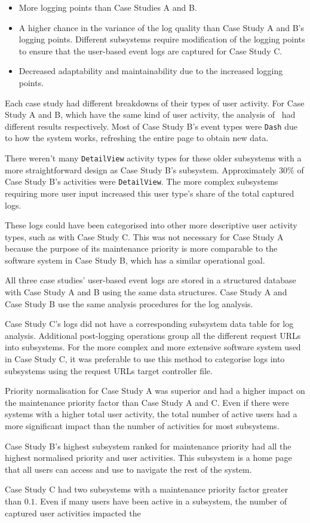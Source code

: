 \begin{itemize}
	\item More logging points than Case Studies A and B. 
	\item A higher chance in the variance of the log quality than Case Study A and B's logging points. Different subsystems require modification of the logging points to ensure that the user-based event logs are captured for Case Study C.
	\item Decreased adaptability and maintainability due to the increased logging points.
\end{itemize}

Each case study had different breakdowns of their types of user activity. For Case Study A and B, which have the same kind of user activity, the analysis of~ had different results respectively. Most of Case Study B's event types were \texttt{Dash} due to how the system works, refreshing the entire page to obtain new data. \par There weren't many \texttt{DetailView} activity types for these older subsystems with a more straightforward design as Case Study B's subsystem. Approximately $30\%$ of Case Study B's activities were \texttt{DetailView}. The more complex subsystems requiring more user input increased this user type's share of the total captured logs. \par These logs could have been categorised into other more descriptive user activity types, such as with Case Study C. This was not necessary for Case Study A because the purpose of its maintenance priority is more comparable to the software system in Case Study B, which has a similar operational goal. \par All three case studies' user-based event logs are stored in a structured database with Case Study A and B using the same data structures. Case Study A and Case Study B use the same analysis procedures for the log analysis. \par Case Study C's logs did not have a corresponding subsystem data table for log analysis. Additional post-logging operations group all the different request URLs into subsystems. For the more complex and more extensive software system used in Case Study C, it was preferable to use this method to categorise logs into subsystems using the request URLs target controller file. \par Priority normalisation for Case Study A was superior and had a higher impact on the maintenance priority factor than Case Study A and C. Even if there were systems with a higher total user activity, the total number of active users had a more significant impact than the number of activities for most subsystems. \par Case Study B's highest subsystem ranked for maintenance priority had all the highest normalised priority and user activities. This subsystem is a home page that all users can access and use to navigate the rest of the system. \par Case Study C had two subsystems with a maintenance priority factor greater than $0.1$. Even if many users have been active in a subsystem, the number of captured user activities impacted the 